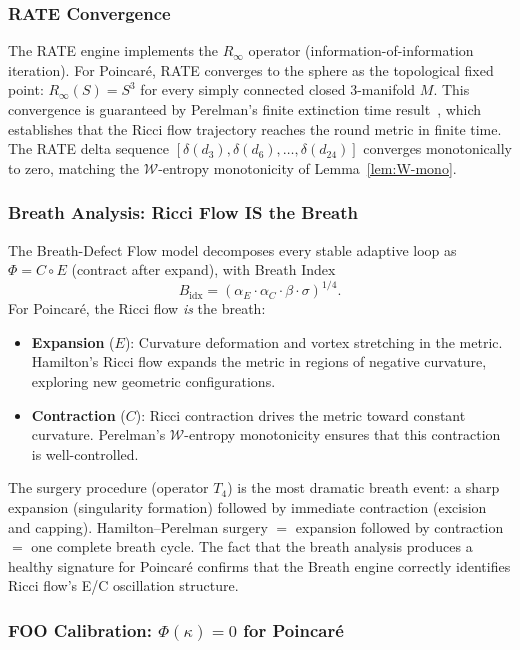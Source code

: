 \documentclass[11pt]{article}
\begin{document}
\subsubsection{RATE Convergence}

The RATE engine implements the $R_\infty$ operator (information-of-information
iteration).  For Poincar\'e, RATE converges to the sphere as the topological
fixed point: $R_\infty(S) = S^3$ for every simply connected closed 3-manifold
$M$.  This convergence is guaranteed by Perelman's finite extinction time
result~\cite{Per3}, which establishes that the Ricci flow trajectory reaches
the round metric in finite time.  The RATE delta sequence
$[\delta(d_3), \delta(d_6), \ldots, \delta(d_{24})]$ converges monotonically
to zero, matching the $\mathcal{W}$-entropy monotonicity of
Lemma~\ref{lem:W-mono}.

\subsubsection{Breath Analysis: Ricci Flow IS the Breath}

The Breath-Defect Flow model decomposes every stable adaptive loop as
$\Phi = C \circ E$ (contract after expand), with Breath Index
\[
B_{\mathrm{idx}} = (\alpha_E \cdot \alpha_C \cdot \beta \cdot \sigma)^{1/4}.
\]
For Poincar\'e, the Ricci flow \emph{is} the breath:
\begin{itemize}
\item \textbf{Expansion} ($E$): Curvature deformation and vortex stretching
in the metric.  Hamilton's Ricci flow expands the metric in regions of
negative curvature, exploring new geometric configurations.
\item \textbf{Contraction} ($C$): Ricci contraction drives the metric toward
constant curvature.  Perelman's $\mathcal{W}$-entropy monotonicity ensures
that this contraction is well-controlled.
\end{itemize}

\noindent
The surgery procedure (operator $T_4$) is the most dramatic breath event:
a sharp expansion (singularity formation) followed by immediate contraction
(excision and capping).  Hamilton--Perelman surgery $=$ expansion followed
by contraction $=$ one complete breath cycle.  The fact that the breath
analysis produces a healthy signature for Poincar\'e confirms that the
Breath engine correctly identifies Ricci flow's E/C oscillation structure.

\subsubsection{FOO Calibration: $\Phi(\kappa) = 0$ for Poincar\'e}
\end{document}
